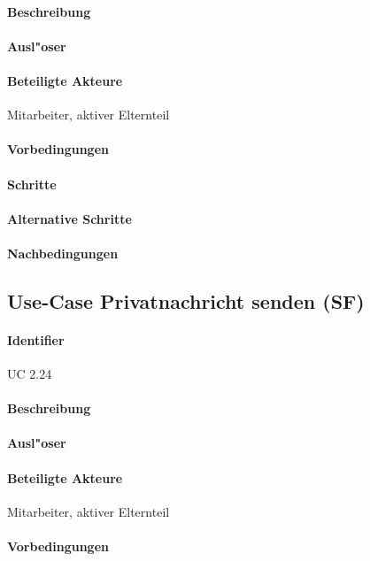   \paragraph{Beschreibung}
  \paragraph{Ausl"oser}
  \paragraph{Beteiligte Akteure}   \leavevmode \newline
    Mitarbeiter, aktiver Elternteil
  \paragraph{Vorbedingungen}
  \paragraph{Schritte}
  \paragraph{Alternative Schritte}
  \paragraph{Nachbedingungen}
  
  \newpage
 \subsection{Use-Case Privatnachricht senden (SF)}
  \paragraph{Identifier}
  UC 2.24
  \paragraph{Beschreibung}
  \paragraph{Ausl"oser}
  \paragraph{Beteiligte Akteure}   \leavevmode \newline
    Mitarbeiter, aktiver Elternteil
  \paragraph{Vorbedingungen}
